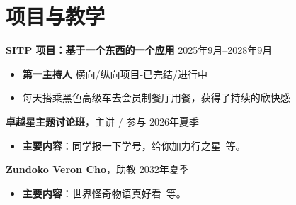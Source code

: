 \documentclass[11pt]{article}
\newlength{\iconwidth}
\begin{document}
    \begin{minipage}[t]{\textwidth}
    \section[项目与教学]{\quad 项目与教学}
    
    {\large \textbf{SITP 项目：基于一个东西的一个应用}} \hfill 2025年9月--2028年9月
    \begin{itemize}
        \item \textbf{第一主持人} \hfill 横向/纵向项目-已完结/进行中
        \item 每天搭乘黑色高级车去会员制餐厅用餐，获得了持续的欣快感
    \end{itemize}

    \vspace{0.5em}
    {\large \textbf{卓越星主题讨论班}}，主讲 / 参与 \hfill 2026年夏季
    \begin{itemize}
        \item \textbf{主要内容}：同学报一下学号，给你加力行之星\ 等。
    \end{itemize}

    \vspace{0.5em}
    {\large \textbf{Zundoko Veron Cho}}，助教 \hfill 2032年夏季
    \begin{itemize}
        \item \textbf{主要内容}：世界怪奇物语真好看\ 等。
    \end{itemize}
    
    \vspace{1.2em}
    \end{minipage}
    
\end{document}
